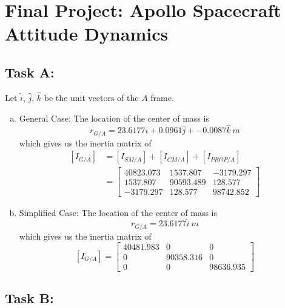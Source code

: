 \documentclass[a4paper]{article}
\begin{document}
\section*{Final Project: Apollo Spacecraft Attitude Dynamics}%

\subsection*{Task A:}%
Let $\hat{i}$, $\hat{j}$, $\hat{k}$ be the unit vectors of the $A$ frame.
\begin{enumerate}[a.]
  \item General Case:
    The location of the center of mass is
    \[
      r_{G/A} = 23.6177 \hat{i} + 0.0961 \hat{j} + -0.0087 \hat{k}\ m
    \]
    which gives us the inertia matrix of
    \[
      \begin{aligned}
        [I_{G/A}] &= [I_{SM/A}] + [I_{CM/A}] + [I_{PROP/A}] \\
            &=
            \begin{bmatrix}
              40823.073 &  1537.807 & -3179.297 \\
              1537.807 & 90593.489 & 128.577 \\
              -3179.297 & 128.577 & 98742.852
            \end{bmatrix}
      \end{aligned}
    \]
  \item Simplified Case:
    The location of the center of mass is
    \[
      r_{G/A} = 23.6177 \hat{i}\ m
    \]
    which gives us the inertia matrix of
    \[
      [I_{G/A}] = 
      \begin{bmatrix}
        40481.983 & 0 & 0 \\
        0 & 90358.316 & 0 \\
        0 & 0 & 98636.935
      \end{bmatrix}
    \]
\end{enumerate}
\subsection*{Task B:}%
\end{document}
